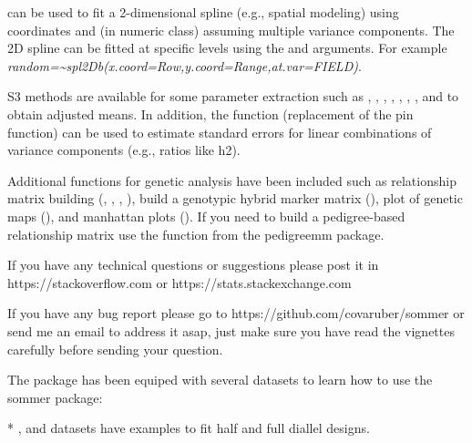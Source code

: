 \documentclass[a4paper]{book}
\begin{document}
\begin{Details}

can be used to fit a 2-dimensional spline (e.g., spatial modeling) using coordinates  and  (in numeric class) assuming multiple variance components. The 2D spline can be fitted at specific levels using the  and  arguments. For example \emph{random=\textasciitilde{}spl2Db(x.coord=Row,y.coord=Range,at.var=FIELD)}.


S3 methods are available for some parameter extraction such as , , , , , , , and  to obtain adjusted means. In addition, the  function (replacement of the pin function) can be used to estimate standard errors for linear combinations of variance components (e.g., ratios like h2). 


Additional functions for genetic analysis have been included such as relationship matrix building (, , , ), build a genotypic hybrid marker matrix (), plot of genetic maps (), and manhattan plots (). If you need to build a pedigree-based relationship matrix use the  function from the pedigreemm package. 


If you have any technical questions or suggestions please post it in https://stackoverflow.com or https://stats.stackexchange.com 

If you have any bug report please go to https://github.com/covaruber/sommer or send me an email to address it asap, just make sure you have read the vignettes carefully before sending your question.


The package has been equiped with several datasets to learn how to use the sommer package: 

* ,  and  datasets have examples to fit half and full diallel designs. 


\end{Details}
\end{document}
